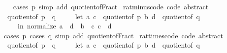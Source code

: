 \begin{isabellebody}
%
\isadelimproof
\ \ %
\endisadelimproof
%
\isatagproof
{}\isamarkupfalse%
\ {\isacharparenleft}{\kern0pt}cases\ p{\isacharparenright}{\kern0pt}\ {\isacharparenleft}{\kern0pt}simp\ add{\isacharcolon}{\kern0pt}\ quotient{\isacharunderscore}{\kern0pt}of{\isacharunderscore}{\kern0pt}Fract{\isacharparenright}{\kern0pt}%
\endisatagproof
{\isafoldproof}%
%
\isadelimproof
\isanewline
%
\endisadelimproof
\isanewline
{}\isamarkupfalse%
\ rat{\isacharunderscore}{\kern0pt}minus{\isacharunderscore}{\kern0pt}code\ {\isacharbrackleft}{\kern0pt}code\ abstract{\isacharbrackright}{\kern0pt}{\isacharcolon}{\kern0pt}\isanewline
\ \ {\isachardoublequoteopen}quotient{\isacharunderscore}{\kern0pt}of\ {\isacharparenleft}{\kern0pt}p\ {\isacharminus}{\kern0pt}\ q{\isacharparenright}{\kern0pt}\ {\isacharequal}{\kern0pt}\isanewline
\ \ \ \ {\isacharparenleft}{\kern0pt}let\ {\isacharparenleft}{\kern0pt}a{\isacharcomma}{\kern0pt}\ c{\isacharparenright}{\kern0pt}\ {\isacharequal}{\kern0pt}\ quotient{\isacharunderscore}{\kern0pt}of\ p{\isacharsemicolon}{\kern0pt}\ {\isacharparenleft}{\kern0pt}b{\isacharcomma}{\kern0pt}\ d{\isacharparenright}{\kern0pt}\ {\isacharequal}{\kern0pt}\ quotient{\isacharunderscore}{\kern0pt}of\ q\isanewline
\ \ \ \ \ in\ normalize\ {\isacharparenleft}{\kern0pt}a\ {\isacharasterisk}{\kern0pt}\ d\ {\isacharminus}{\kern0pt}\ b\ {\isacharasterisk}{\kern0pt}\ c{\isacharcomma}{\kern0pt}\ c\ {\isacharasterisk}{\kern0pt}\ d{\isacharparenright}{\kern0pt}{\isacharparenright}{\kern0pt}{\isachardoublequoteclose}\isanewline
%
\isadelimproof
\ \ %
\endisadelimproof
%
\isatagproof
{}\isamarkupfalse%
\ {\isacharparenleft}{\kern0pt}cases\ p{\isacharcomma}{\kern0pt}\ cases\ q{\isacharparenright}{\kern0pt}\ {\isacharparenleft}{\kern0pt}simp\ add{\isacharcolon}{\kern0pt}\ quotient{\isacharunderscore}{\kern0pt}of{\isacharunderscore}{\kern0pt}Fract{\isacharparenright}{\kern0pt}%
\endisatagproof
{\isafoldproof}%
%
\isadelimproof
\isanewline
%
\endisadelimproof
\isanewline
{}\isamarkupfalse%
\ rat{\isacharunderscore}{\kern0pt}times{\isacharunderscore}{\kern0pt}code\ {\isacharbrackleft}{\kern0pt}code\ abstract{\isacharbrackright}{\kern0pt}{\isacharcolon}{\kern0pt}\isanewline
\ \ {\isachardoublequoteopen}quotient{\isacharunderscore}{\kern0pt}of\ {\isacharparenleft}{\kern0pt}p\ {\isacharasterisk}{\kern0pt}\ q{\isacharparenright}{\kern0pt}\ {\isacharequal}{\kern0pt}\isanewline
\ \ \ \ {\isacharparenleft}{\kern0pt}let\ {\isacharparenleft}{\kern0pt}a{\isacharcomma}{\kern0pt}\ c{\isacharparenright}{\kern0pt}\ {\isacharequal}{\kern0pt}\ quotient{\isacharunderscore}{\kern0pt}of\ p{\isacharsemicolon}{\kern0pt}\ {\isacharparenleft}{\kern0pt}b{\isacharcomma}{\kern0pt}\ d{\isacharparenright}{\kern0pt}\ {\isacharequal}{\kern0pt}\ quotient{\isacharunderscore}{\kern0pt}of\ q\isanewline

\end{isabellebody}
